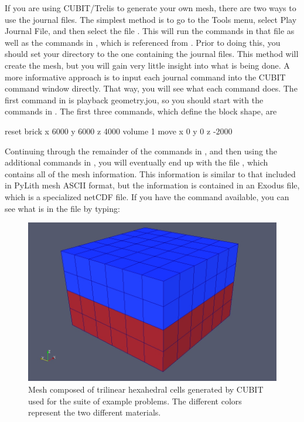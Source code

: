 If you are using CUBIT/Trelis to generate your own mesh, there are two
ways to use the journal files. The simplest method is to go to the
\textsf{Tools} menu, select \textsf{Play Journal File}, and then
select the file . This will run the
commands in that file as well as the commands in
, which is referenced from
. Prior to doing this, you should set
your directory to the one containing the journal files. This method
will create the mesh, but you will gain very little insight into what
is being done. A more informative approach is to input each journal
command into the CUBIT command window directly.  That way, you will
see what each command does. The first command in
 is \textsf{playback geometry.jou}, so
you should start with the commands in . The
first three commands, which define the block shape, are
\begin{shell}
reset
brick x 6000 y 6000 z 4000
volume 1 move x 0 y 0 z -2000
\end{shell}
Continuing through the remainder of the commands in ,
and then using the additional commands in ,
you will eventually end up with the file ,
which contains all of the mesh information. This information is similar
to that included in PyLith mesh ASCII format, but the information
is contained in an Exodus file, which is a specialized netCDF file.
If you have the  command available, you can see what
is in the file by typing:

\begin{figure}
  \includegraphics[scale=0.33]{examples/figs/3dhex8_mesh}
  \caption{Mesh composed of trilinear hexahedral cells generated by CUBIT used
    for the suite of example problems. The different colors represent
    the two different materials.}
  \label{fig:3dhex8:mesh}
\end{figure}



